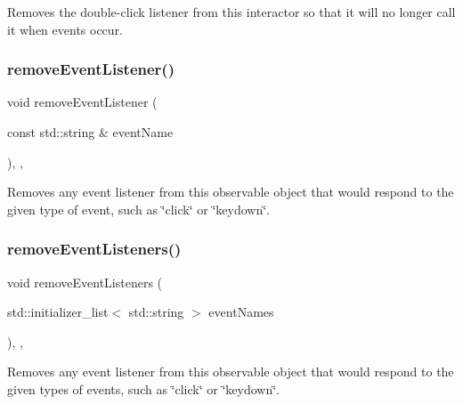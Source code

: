 Removes the double-\/click listener from this interactor so that it will no longer call it when events occur. 

\mbox{\label{classGObservable_acbcf1ed3a851ad8a3c17ef38d86b481d}} 
\subsubsection{\texorpdfstring{remove\+Event\+Listener()}{removeEventListener()}}
{\footnotesize\ttfamily void remove\+Event\+Listener (\begin{DoxyParamCaption}\item[{const std\+::string \&}]{event\+Name }\end{DoxyParamCaption})\hspace{0.3cm}{\ttfamily [protected]}, {\ttfamily [virtual]}, {\ttfamily [inherited]}}



Removes any event listener from this observable object that would respond to the given type of event, such as \char`\"{}click\char`\"{} or \char`\"{}keydown\char`\"{}. 

\mbox{\label{classGObservable_af51cc35c29a1bd1908609d432decdbb6}} 
\subsubsection{\texorpdfstring{remove\+Event\+Listeners()}{removeEventListeners()}}
{\footnotesize\ttfamily void remove\+Event\+Listeners (\begin{DoxyParamCaption}\item[{std\+::initializer\+\_\+list$<$ std\+::string $>$}]{event\+Names }\end{DoxyParamCaption})\hspace{0.3cm}{\ttfamily [protected]}, {\ttfamily [virtual]}, {\ttfamily [inherited]}}



Removes any event listener from this observable object that would respond to the given types of events, such as \char`\"{}click\char`\"{} or \char`\"{}keydown\char`\"{}. 

